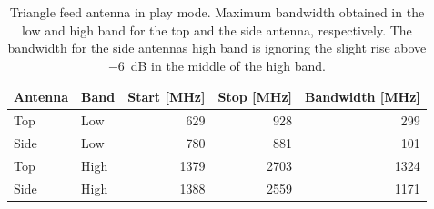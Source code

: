 \begin{table}[htbp]
    \centering
    \begin{tabular}{|l|l|r|r|r|}
        \hline
        Antenna & Band & Start [MHz] & Stop [MHz] & Bandwidth [MHz] \\
        \hline
        Top     & Low  & 629         & 928        & 299  \\
        Side    & Low  & 780         & 881        & 101  \\
        \hline
        Top     & High & 1379        & 2703       & 1324 \\
        Side    & High & 1388        & 2559       & 1171 \\
        \hline
    \end{tabular}
    \caption{Triangle feed antenna in play mode. Maximum bandwidth obtained in the low and high band for the top and the side antenna, respectively. The bandwidth for the side antennas high band is ignoring the slight rise above \SI{-6}{dB} in the middle of the high band.}
    \label{tab:bw_sol2play}
\end{table}

